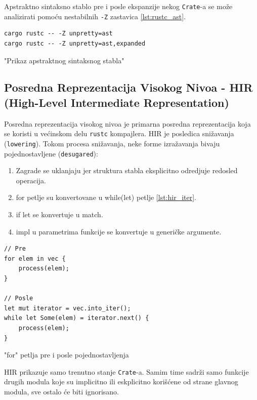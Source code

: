 \documentclass[11pt]{article}
\begin{document}
Apstraktno sintaksno stablo pre i posle ekspanzije nekog \verb|Crate|-a se može analizirati pomoću 
nestabilnih \verb|-Z| zastavica \ref{lst:rustc_ast}.

\begin{listing}[H]
\begin{verbatim}
cargo rustc -- -Z unpretty=ast
cargo rustc -- -Z unpretty=ast,expanded
\end{verbatim}
\caption{"Prikaz apstraktnog sintaksnog stabla"}
\label{lst:rustc_ast}
\end{listing}

\newpage
\subsection{Posredna Reprezentacija Visokog Nivoa - HIR (High-Level Intermediate Representation)}


Posredna reprezentacija visokog nivoa je primarna posredna reprezentacija koja se koristi 
u većinskom delu \verb|rustc| kompajlera. HIR je posledica snižavanja (\verb|lowering|). 
Tokom procesa snižavanja, neke forme izražavanja bivaju pojednostavljene (\verb|desugared|):
\begin{enumerate}
    \item Zagrade se uklanjaju jer struktura stabla eksplicitno odredjuje redosled operacija.
    \item for petlje su konvertovane u while(let) petlje \ref{lst:hir_iter}.
    \item if let se konvertuje u match.
    \item impl u parametrima funkcije se konvertuje u generičke argumente.
\end{enumerate}

\begin{listing}[H]
\begin{verbatim}
// Pre
for elem in vec {
    process(elem);
}

// Posle
let mut iterator = vec.into_iter();
while let Some(elem) = iterator.next() {
    process(elem);
}
\end{verbatim}
\caption{"for" petlja pre i posle pojednostavljenja}
\label{lst:hir_iter}
\end{listing}

HIR prikazuje samo trenutno stanje \verb|Crate|-a.
Samim time sadrži samo funkcije drugih modula koje su implicitno ili eskplicitno korišćene 
od strane glavnog modula, sve ostalo će biti ignorisano.
\end{document}
